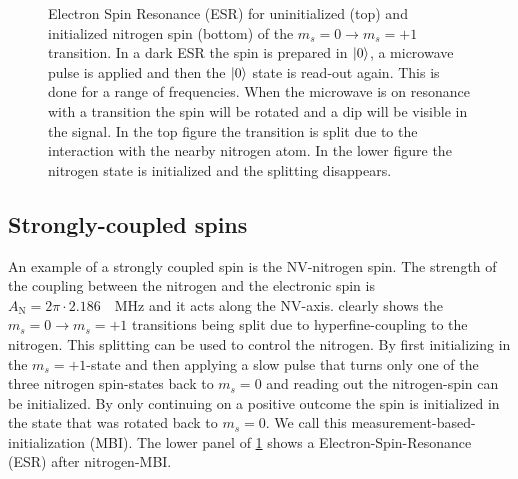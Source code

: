 \begin{figure}[htbp]
\centering
    \caption{ Electron Spin Resonance (ESR) for uninitialized (top) and initialized nitrogen spin (bottom) of the $m_s =0 \rightarrow m_s = +1$ transition. In a dark ESR the spin is prepared in ${\left\vert{0}\right\rangle}$, a microwave pulse is applied and then the ${\left\vert{0}\right\rangle}$ state is read-out again. This is done for a range of frequencies. When the microwave is on resonance with a transition the spin will be rotated and a dip will be visible in the signal. In the top figure the transition is split due to the interaction with the nearby nitrogen atom. In the lower figure the nitrogen state is initialized and the splitting disappears.}
    \label{fig:HF_split_levels}
\end{figure}

\subsection{Strongly-coupled spins}
An example of a strongly coupled spin is the NV-nitrogen spin.
The strength of the coupling between the nitrogen and the electronic spin is $A_\mathrm{N} = 2\pi \cdot 2.186\quad \mathrm{MHz} $\citep{Bernien2014Control} and it acts along the NV-axis.
 clearly shows the $m_s =0 \rightarrow m_s=+1$ transitions being split due to hyperfine-coupling to the nitrogen.
This splitting can be used to control the nitrogen.
By first initializing in the $m_s =+1$-state and then applying a slow pulse that turns only one of the three nitrogen spin-states back to $m_s=0$ and reading out the nitrogen-spin can be initialized. By only continuing on a positive outcome the spin is initialized in the state that was rotated back to $m_s =0$. We call this measurement-based-initialization (MBI).
The lower panel of \cref{fig:HF_split_levels} shows a Electron-Spin-Resonance (ESR) after nitrogen-MBI.

